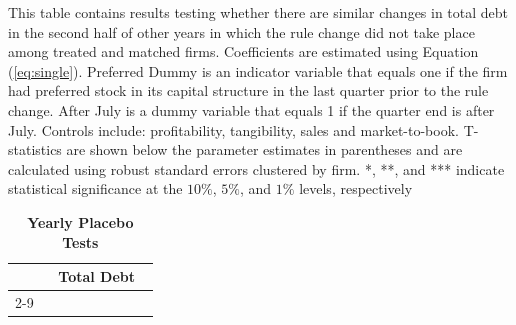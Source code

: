 \documentclass[a4paper, 12pt]{article}
\begin{document}
\begin{landscape}
\pagestyle{empty}
\begin{table}[htbp]
\caption{\textbf{Yearly Placebo Tests}} \label{table_placebo}
\begin{singlespace}
\begin{small}

This table contains results testing whether there are similar changes in total debt in the second half of other years in which the rule change did not take place among treated and matched firms. Coefficients are estimated using Equation (\ref{eq:single}).  Preferred Dummy is an indicator variable that equals one if the firm had preferred stock in its capital structure in the last quarter prior to the rule change. After July is a dummy variable that equals 1 if the quarter end is after July. Controls include: profitability, tangibility, sales and market-to-book. T-statistics are shown below the parameter estimates in parentheses and are calculated using robust standard errors clustered by firm. *, **, and *** indicate statistical significance at the $10\%$, $5\%$, and $1\%$ levels, respectively
\end{small}
\end{singlespace}
\vspace{3mm}

\small
  \centering
\begin{tabular}{lcccccccc}
    \toprule
    \textbf{} &
      \multicolumn{8}{c}{\textbf{Total Debt}}
      \\
                \cline{2-9}
  

    \bottomrule
    \end{tabular}
\end{table}
\end{landscape}
\clearpage
\newpage
\end{document}
